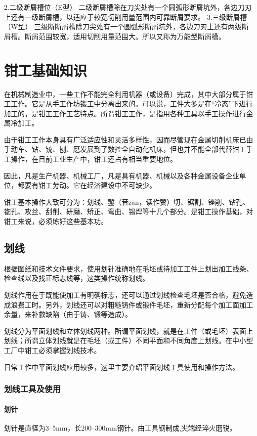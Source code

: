 \documentclass{ctexbook}
\begin{document}
2.二级断屑槽位（E型）
二级断屑槽除在刀尖处有一个圆弧形断屑坑外，各边刀刃上还有一级断屑槽，以适应于较宽切削用量范围内可靠断屑要求。
3.三级断屑槽（W型）
三级断断屑槽除刀尖处有一个圆弧形断屑坑外，各边刀刃上还有两级断屑槽。断屑范围较宽，适用切削用量范围大。所以又称为万能型断屑槽。
\chapter{钳工基础知识}
在机械制造业中，一些工作不能完全利用机器（或设备）完成，其中大部分属于钳工工作。它是从手工作坊锻工中分离出来的。可以说，工件大多是在“冷态”下进行加工的，是钳工工作工艺特点。所谓钳工工作，是指用各种工具以手工操作进行金属冷加工。

由于钳工工作本身具有广泛适应性和灵活多样性，因而尽管现在金属切削机床已由手动车、钻、铳、刨、磨发展到了数控全自动化机床，但也并不能全部代替钳工手工操作，在目前工业生产中，钳工还占有相当重要地位。

因此，凡是生产机器、机械工厂，凡是具有机器、机械以及各种金属设备企业单位，都要有钳工劳动。它在经济建设中不可缺少。

钳工基本操作大致可分为：划线、錾（音zan，读作赞）切、锯割、锉削、钻孔、锪孔、攻丝、刮削、研磨、矫正、弯曲、锡焊等十几个部分。是钳工操作基础，对钳工来说，必须练好这些基本功。
\section{划线}
根据图纸和技术文件要求，使用划针准确地在毛坯或待加工工件上划出加工线条、检查线以及找正标志线等，这类操作统称划线。

划线作用在于既能使加工有明确标志，还可以通过划线检查毛坯是否合格，避免造成浪费工时。另外，划线还可以对粗糙铸件或锻件毛坯，重新分配每个加工面加工余量，来补救缺陷（由于铸、锻等造成）。

划线分为平面划线和立体划线两种。所谓平面划线，就是在工件（或毛坯）表面上划线；所谓立体划线就是在毛坯（或工件）不同平面和不同角度上划线。在中小型工厂中钳工必须掌握划线技术。

日常工作中平面划线应用较多，这里主要介绍平面划线工具使用和操作方法。
\subsection{划线工具及使用}
\subsubsection{划针}
划针是直径为3--5mm，长200--300mm钢针。由工具钢制成,尖端经淬火磨锐。
\end{document}
